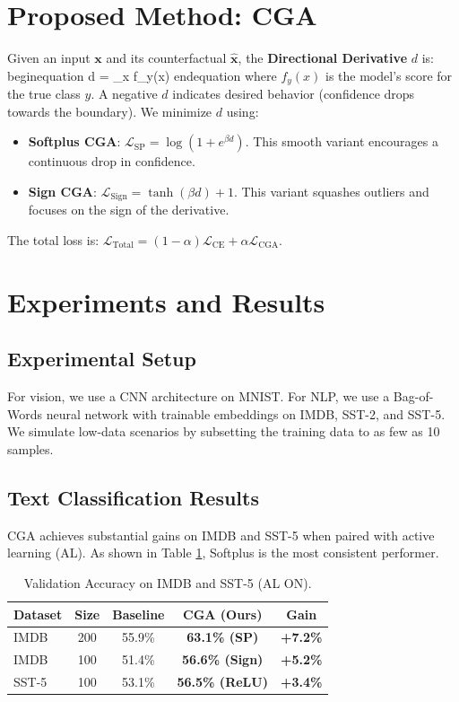 \documentclass[sigconf,anonymous]{aamas}
\begin{document}
\section{Proposed Method: CGA}
Given an input $\mathbf{x}$ and its counterfactual $\hat{\mathbf{x}}$, the \textbf{Directional Derivative} $d$ is:
begin{equation}
    d = \nabla_x f_{y}(x) \cdot {}
end{equation}
where $f_y(x)$ is the model's score for the true class $y$. A negative $d$ indicates desired behavior (confidence drops towards the boundary). We minimize $d$ using:
\begin{itemize}
    \item \textbf{Softplus CGA}: $\mathcal{L}_{\text{SP}} = \log(1 + e^{\beta d})$. This smooth variant encourages a continuous drop in confidence.
    \item \textbf{Sign CGA}: $\mathcal{L}_{\text{Sign}} = \tanh(\beta d) + 1$. This variant squashes outliers and focuses on the sign of the derivative.
\end{itemize}
The total loss is: $\mathcal{L}_{\text{Total}} = (1-\alpha)\mathcal{L}_{\text{CE}} + \alpha\mathcal{L}_{\text{CGA}}$.

\section{Experiments and Results}

\subsection{Experimental Setup}
For vision, we use a CNN architecture on MNIST. For NLP, we use a Bag-of-Words neural network with trainable embeddings on IMDB, SST-2, and SST-5. We simulate low-data scenarios by subsetting the training data to as few as 10 samples.

\subsection{Text Classification Results}
CGA achieves substantial gains on IMDB and SST-5 when paired with active learning (AL). As shown in Table \ref{tab:nlp_results}, Softplus is the most consistent performer.

\begin{table}[h]
\centering
\caption{Validation Accuracy on IMDB and SST-5 (AL ON).}
\label{tab:nlp_results}
\begin{tabular}{lcccc}
\toprule
\textbf{Dataset} & \textbf{Size} & \textbf{Baseline} & \textbf{CGA (Ours)} & \textbf{Gain} \\ \midrule
IMDB & 200 & 55.9\% & \textbf{63.1\% (SP)} & \textbf{+7.2\%} \\
IMDB & 100 & 51.4\% & \textbf{56.6\% (Sign)} & \textbf{+5.2\%} \\
SST-5 & 100 & 53.1\% & \textbf{56.5\% (ReLU)} & \textbf{+3.4\%} \\
\bottomrule
\end{tabular}
\end{table}
\end{document}
